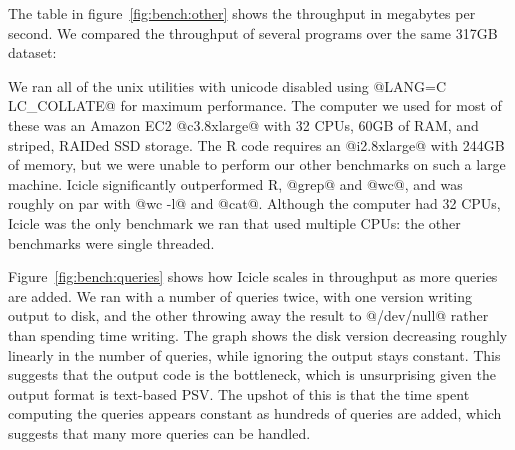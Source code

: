 
The table in figure~\ref{fig:bench:other} shows the throughput in megabytes per second.
We compared the throughput of several programs over the same 317GB dataset:

We ran all of the unix utilities with unicode disabled using @LANG=C LC_COLLATE@ for maximum performance.
The computer we used for most of these was an Amazon EC2 @c3.8xlarge@ with 32 CPUs, 60GB of RAM, and striped, RAIDed SSD storage.
The R code requires an @i2.8xlarge@ with 244GB of memory, but we were unable to perform our other benchmarks on such a large machine.
Icicle significantly outperformed R, @grep@ and @wc@, and was roughly on par with @wc -l@ and @cat@.
Although the computer had 32 CPUs, Icicle was the only benchmark we ran that used multiple CPUs: the other benchmarks were single threaded.

Figure~\ref{fig:bench:queries} shows how Icicle scales in throughput as more queries are added.
We ran with a number of queries twice, with one version writing output to disk, and the other throwing away the result to @/dev/null@ rather than spending time writing.
The graph shows the disk version decreasing roughly linearly in the number of queries, while ignoring the output stays constant.
This suggests that the output code is the bottleneck, which is unsurprising given the output format is text-based PSV.
The upshot of this is that the time spent computing the queries appears constant as hundreds of queries are added, which suggests that many more queries can be handled.

